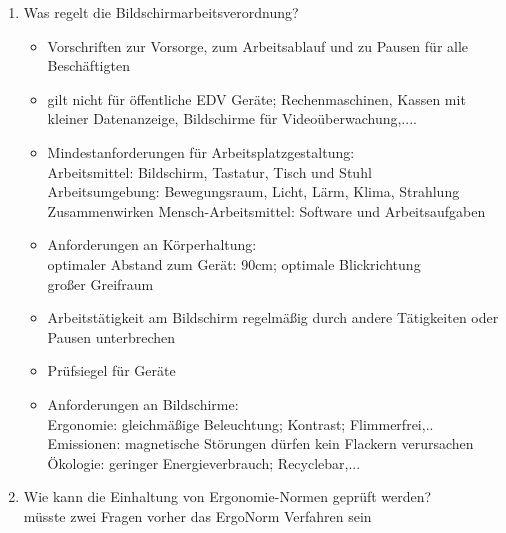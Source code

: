 \begin{enumerate}
	\item Was regelt die Bildschirmarbeitsverordnung?
	\begin{itemize}
		\item Vorschriften zur Vorsorge, zum Arbeitsablauf und zu Pausen für alle Beschäftigten
		\item gilt nicht für öffentliche EDV Geräte; Rechenmaschinen, Kassen mit kleiner Datenanzeige, Bildschirme für Videoüberwachung,....
		\item Mindestanforderungen für Arbeitsplatzgestaltung: \\
		Arbeitsmittel: Bildschirm, Tastatur, Tisch und Stuhl\\
		Arbeitsumgebung: Bewegungsraum, Licht, Lärm, Klima, Strahlung\\
		Zusammenwirken Mensch-Arbeitsmittel: Software und Arbeitsaufgaben
		\item Anforderungen an Körperhaltung: \\
		optimaler Abstand zum Gerät: 90cm; optimale Blickrichtung\\
		großer Greifraum
		\item Arbeitstätigkeit am Bildschirm regelmäßig durch andere Tätigkeiten oder Pausen unterbrechen
		\item Prüfsiegel für Geräte
		\item Anforderungen an Bildschirme: \\
		Ergonomie: gleichmäßige Beleuchtung; Kontrast; Flimmerfrei,..\\
		Emissionen: magnetische Störungen dürfen kein Flackern verursachen\\
		Ökologie: geringer Energieverbrauch; Recyclebar,...
	\end{itemize}
	
	\item Wie kann die Einhaltung von Ergonomie-Normen geprüft werden?\\
	müsste zwei Fragen vorher das ErgoNorm Verfahren sein
\end{enumerate}

